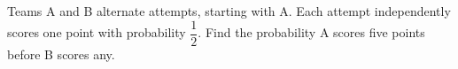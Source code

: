 Teams A and B alternate attempts, starting with A. Each attempt independently scores one point with probability $\dfrac{1}{2}$. Find the probability A scores five points before B scores any.
